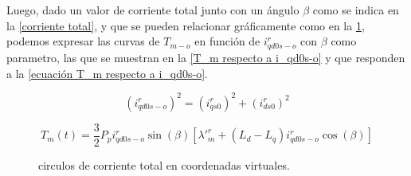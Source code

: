 \documentclass[a4paper, 10pt, onecolumn,journal]{ieeeconf}
\begin{document}
Luego, dado un valor de corriente total junto con un
ángulo $\beta$ como se indica en la \cref{corriente total}, y que se pueden relacionar
gráficamente como en la \cref{restriccion de corriente maxima}, podemos expresar
las curvas de $T_{m-o}$ en función de $i^{r}_{qd0s-o}$ con $\beta$ como parametro, las que
se muestran en la \cref{T_m respecto a i_qd0s-o} y que responden a la \cref{ecuación T_m respecto a i_qd0s-o}.


\begin{equation}
    \left(i^{r}_{qd0s-o}\right)^2 = \left(i^{r}_{qs0}\right)^2 + \left(i^{r}_{ds0}\right)^2
    \label{corriente total}
\end{equation}

\begin{equation}
    T_m(t) = \frac{3}{2} P_p i^r_{qd0s-o}\sin(\beta)\left[\lambda'^r_m + (L_d - L_q) i^r_{qd0s-o}\cos(\beta)\right]
    \label{ecuación T_m respecto a i_qd0s-o}
\end{equation}

\begin{figure}[thpb]
    \centering
    \begin{adjustbox}{scale = 0.6}
    \end{adjustbox}
    \caption{circulos de corriente total en coordenadas virtuales.}
    \label{restriccion de corriente maxima}
\end{figure}
\end{document}
